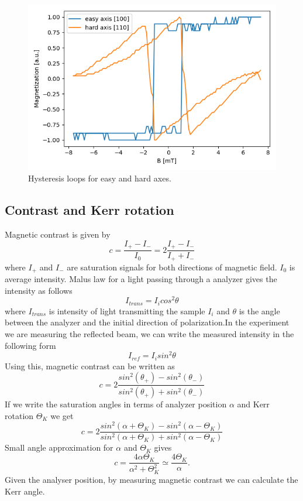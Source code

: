 \documentclass{article}
\begin{document}
\begin{figure}[h!]
\centering
\includegraphics[width=0.7\linewidth]{LAB/MOKE/hysteresis.png}
\caption{Hysteresis loops for easy and hard axes.}
\label{fig:exp_setup}
\end{figure}

\clearpage
\subsection{Contrast and Kerr rotation}
Magnetic contrast is given by
\begin{equation}
c = \frac{I_{+} - I_{-}} {I_{0}} = 2  \frac{I_{+} - I_{-}} {I_{+} + I_{-}}
\end{equation}
where $I_{+}$ and $I_{-}$ are saturation signals for both directions of magnetic field. $I_{0}$ is average intensity. Malus law for a light passing through a analyzer gives the intensity as follows
\begin{equation}
I_{trans} = I_{i} cos^2 \theta 
\end{equation}
where $I_{trans}$ is intensity of light transmitting the sample $I_{i}$ and $\theta$ is the angle between the analyzer and the initial direction of polarization.In the experiment we are measuring the reflected beam, we can write the measured intensity in the following form
\begin{equation}
I_{ref} = I_{i} sin^2 \theta
\end{equation}
Using this, magnetic contrast can be written as
$$ c = 2\frac{sin^2(\theta_+) - sin^2(\theta_-)}{sin^2(\theta_+) + sin^2(\theta_-)} $$
If we write the saturation angles in terms of analyzer position $\alpha$ and Kerr rotation $\Theta_K$ we get
$$ c = 2\frac{sin^2(\alpha + \Theta_K) - sin^2(\alpha - \Theta_K)}{sin^2(\alpha + \Theta_K) + sin^2(\alpha - \Theta_K)} $$
Small angle approximation for $\alpha$ and $\Theta_K$ gives
$$ c = \frac{4\alpha\Theta_K}{\alpha^2+\Theta^2_K} \simeq \frac{4\Theta_K}{\alpha}.$$
Given the analyser position, by measuring magnetic contrast we can calculate the Kerr angle.
\end{document}
